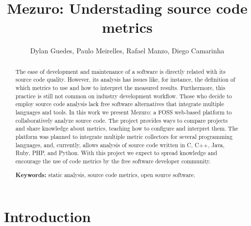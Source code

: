 \documentclass{llncs}
\begin{document}
\sloppy
\title{Mezuro: Understading source code metrics}

\author{Dylan Guedes, Paulo Meirelles,
        Rafael Manzo, Diego Camarinha}



\maketitle
\begin{abstract}
  The ease of development and maintenance of a software is directly related
with its source code quality.
  However, its analysis has issues like, for instance, the definition of which
metrics to use and how to interpret the measured results. Furthermore, this practice
is still not common on industry development workflow. Those who decide to employ
source code analysis lack free software alternatives that integrate multiple languages
and tools.
In this work we present Mezuro: a FOSS web-based platform to collaboratively analyze
source code. The project provides ways to compare projects and share knowledge
about metrics, teaching how to configure and interpret them. The platform was
planned to integrate multiple metric collectors for several programming
languages, and, currently, allows analysis of source code written in C, C++,
Java, Ruby, PHP, and Python.
    With this project we expect to spread knowledge and encourage the use of
code metrics by the free software developer community.

\textbf{Keywords:} static analysis, source code metrics, open source software.
\end{abstract}

\section{Introduction}
\label{sec:intro}
\end{document}

